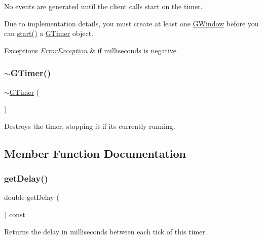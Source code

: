 No events are generated until the client calls {\ttfamily start} on the timer.

Due to implementation details, you must create at least one \mbox{\hyperlink{classGWindow}{G\+Window}} before you can \mbox{\hyperlink{classGTimer_a60de64d75454385b23995437f1d72669}{start()}} a \mbox{\hyperlink{classGTimer}{G\+Timer}} object.


\begin{DoxyExceptions}{Exceptions}
{\em \mbox{\hyperlink{classErrorException}{Error\+Exception}}} & if milliseconds is negative \\
\hline
\end{DoxyExceptions}
\mbox{\label{classGTimer_a2f693771957cae3efd9bfc952c543961}} 
\subsubsection{\texorpdfstring{$\sim$\+G\+Timer()}{~GTimer()}}
{\footnotesize\ttfamily $\sim$\mbox{\hyperlink{classGTimer}{G\+Timer}} (\begin{DoxyParamCaption}{ }\end{DoxyParamCaption})}



Destroys the timer, stopping it if it\textquotesingle{}s currently running. 



\subsection{Member Function Documentation}
\mbox{\label{classGTimer_a73d6fbcedb3f4c8379a76161503dc8f8}} 
\subsubsection{\texorpdfstring{get\+Delay()}{getDelay()}}
{\footnotesize\ttfamily double get\+Delay (\begin{DoxyParamCaption}{ }\end{DoxyParamCaption}) const}



Returns the delay in milliseconds between each tick of this timer. 

